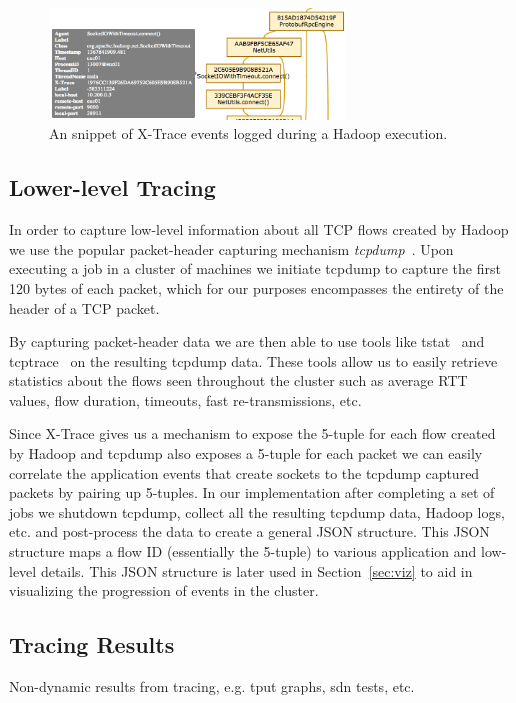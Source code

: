 \begin{figure}
\centering
\includegraphics[width=0.7\textwidth]{figures/xtrace-example2.png}
\caption{An snippet of X-Trace events logged during a Hadoop execution.}
\label{fig:xtrace}
\end{figure}

\subsection{Lower-level Tracing}
\label{ssec:low}
In order to capture low-level information about all TCP flows created by Hadoop 
we use the popular packet-header capturing mechanism \emph{tcpdump}~\cite{tcpdump}.
Upon executing a job in a cluster of machines we initiate tcpdump to capture the 
first 120 bytes of each packet, which for our purposes encompasses the entirety of 
the header of a TCP packet. 

By capturing packet-header data we are then able to use tools like tstat~\cite{tstat}
and tcptrace~\cite{tcptrace} on the resulting tcpdump data. These tools allow us to 
easily retrieve statistics about the flows seen throughout the cluster such as 
average RTT values, flow duration, timeouts, fast re-transmissions, etc. 

Since X-Trace gives us a mechanism to expose the 5-tuple for each flow created by 
Hadoop and tcpdump also exposes a 5-tuple for each packet we can easily correlate
the application events that create sockets to the tcpdump captured packets by 
pairing up 5-tuples. In our implementation after completing a set of jobs we 
shutdown tcpdump, collect all the resulting tcpdump data, Hadoop logs, etc. and 
post-process the data to create a general JSON structure. This JSON structure maps
a flow ID (essentially the 5-tuple) to various application and low-level details. 
This JSON structure is later used in Section~\ref{sec:viz} to aid in visualizing the 
progression of events in the cluster.

\subsection{Tracing Results}
\label{ssec:results}
Non-dynamic results from tracing, e.g. tput graphs, sdn tests, etc.

